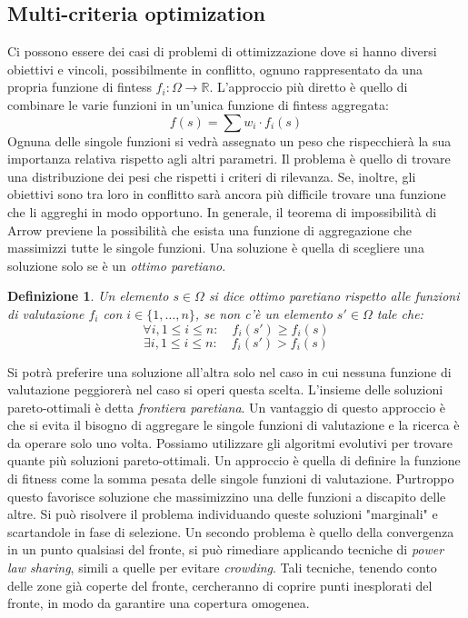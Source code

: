 \documentclass[10pt,a4paper]{article}
\newtheorem{definition}{Definizione}
\begin{document}
\subsection{Multi-criteria optimization}

Ci possono essere dei casi di problemi di ottimizzazione dove si hanno diversi obiettivi e vincoli, possibilmente in conflitto, ognuno rappresentato da una propria funzione di fintess $f_i : \Omega \to \mathbb{R}$. L'approccio più diretto è quello di combinare le varie funzioni in un'unica funzione di fintess aggregata:
$$
f(s) = \sum w_i \cdot f_i(s)
$$
Ognuna delle singole funzioni si vedrà assegnato un peso che rispecchierà la sua importanza relativa rispetto agli altri parametri. Il problema è quello di trovare una distribuzione dei pesi che rispetti i criteri di rilevanza. Se, inoltre, gli obiettivi sono tra loro in conflitto sarà ancora più difficile trovare una funzione che li aggreghi in modo opportuno. In generale, il teorema di impossibilità di Arrow previene la possibilità che esista una funzione di aggregazione che massimizzi tutte le singole funzioni. Una soluzione è quella di scegliere una soluzione solo se è un \emph{ottimo paretiano}.

\begin{definition}
Un elemento $s \in \Omega$ si dice \emph{ottimo paretiano} rispetto alle funzioni di valutazione $f_i$ con $i \in \{1, \dots, n\}$, se non c'è un elemento $s' \in \Omega$ tale che:
$$
\forall i, 1 \leq i \leq n: \quad f_i(s') \geq f_i(s)
$$ 
$$
\exists i, 1 \leq i \leq n: \quad f_i(s') > f_i(s)
$$
\end{definition}

Si potrà preferire una soluzione all'altra solo nel caso in cui nessuna funzione di valutazione peggiorerà nel caso si operi questa scelta. L'insieme delle soluzioni pareto-ottimali è detta \emph{frontiera paretiana}. Un vantaggio di questo approccio è che si evita il bisogno di aggregare le singole funzioni di valutazione e la ricerca è da operare solo uno volta. Possiamo utilizzare gli algoritmi evolutivi per trovare quante più soluzioni pareto-ottimali. Un approccio è quella di definire la funzione di fitness come la somma pesata delle singole funzioni di valutazione. Purtroppo questo favorisce soluzione che massimizzino una delle funzioni a discapito delle altre. Si può risolvere il problema individuando queste soluzioni "marginali" e scartandole in fase di selezione. Un secondo problema è quello della convergenza in un punto qualsiasi del fronte, si può rimediare applicando tecniche di \emph{power law sharing}, simili a quelle per evitare \emph{crowding}. Tali tecniche, tenendo conto delle zone già coperte del fronte, cercheranno di coprire punti inesplorati del fronte, in modo da garantire una copertura omogenea.
\end{document}
